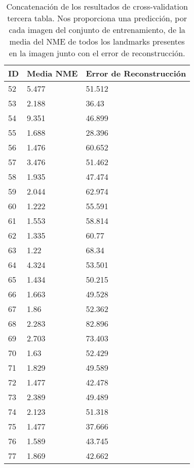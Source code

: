 \begin{table}[!ht]
    \centering
    \caption{Concatenación de los resultados de cross-validation tercera tabla. Nos proporciona una predicción, por cada imagen del conjunto de entrenamiento, de la media del NME de todos los landmarks presentes en la imagen junto con el error de reconstrucción.}
    \begin{tabular}{|l|l|l|}
    \hline
        \cellcolor{gray!25}\textbf{ID} & \cellcolor{gray!25}\textbf{Media NME} & \cellcolor{gray!25}\textbf{Error de Reconstrucción} \\ \hline
        52 & 5.477 & 51.512 \\ \hline
        53 & 2.188 & 36.43 \\ \hline
        54 & 9.351 & 46.899 \\ \hline
        55 & 1.688 & 28.396 \\ \hline
        56 & 1.476 & 60.652 \\ \hline
        57 & 3.476 & 51.462 \\ \hline
        58 & 1.935 & 47.474 \\ \hline
        59 & 2.044 & 62.974 \\ \hline
        60 & 1.222 & 55.591 \\ \hline
        61 & 1.553 & 58.814 \\ \hline
        62 & 1.335 & 60.77 \\ \hline
        63 & 1.22 & 68.34 \\ \hline
        64 & 4.324 & 53.501 \\ \hline
        65 & 1.434 & 50.215 \\ \hline
        66 & 1.663 & 49.528 \\ \hline
        67 & 1.86 & 52.362 \\ \hline
        68 & 2.283 & 82.896 \\ \hline
        69 & 2.703 & 73.403 \\ \hline
        70 & 1.63 & 52.429 \\ \hline
        71 & 1.829 & 49.589 \\ \hline
        72 & 1.477 & 42.478 \\ \hline
        73 & 2.389 & 49.489 \\ \hline
        74 & 2.123 & 51.318 \\ \hline
        75 & 1.477 & 37.666 \\ \hline
        76 & 1.589 & 43.745 \\ \hline
        77 & 1.869 & 42.662 \\ \hline
    \end{tabular}
    \label{table:ModelBase_landmarkresume}
\end{table}


